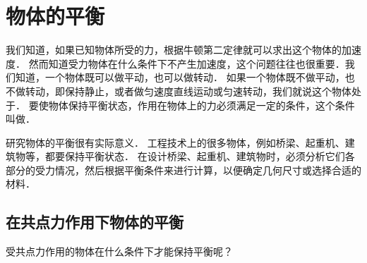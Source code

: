 \chapter{物体的平衡}\label{chapter-equilibrium-of-object}


我们知道，如果已知物体所受的力，根据牛顿第二定律就可以求出这个物体的加速度．
然而知道受力物体在什么条件下不产生加速度，这个问题往往也很重要．我们知道，一个物体既可以做平动，也可以做转动．
如果一个物体既不做平动，也不做转动，即保持静止，或者做匀速度直线运动或匀速转动，我们就说这个物体处于．
要使物体保持平衡状态，作用在物体上的力必须满足一定的条件，这个条件叫做．

研究物体的平衡很有实际意义．
工程技术上的很多物体，例如桥梁、起重机、建筑物等，都要保持平衡状态．
在设计桥梁、起重机、建筑物时，必须分析它们各部分的受力情况，然后根据平衡条件来进行计算，以便确定几何尺寸或选择合适的材料．

\section{在共点力作用下物体的平衡}

受共点力作用的物体在什么条件下才能保持平衡呢？

